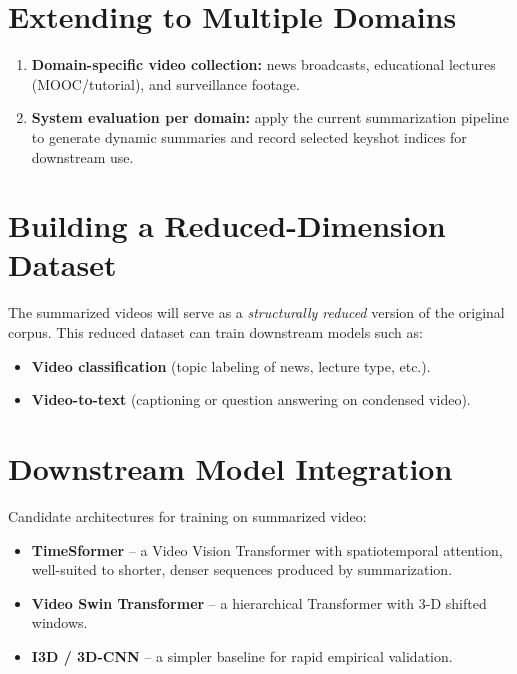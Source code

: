 \documentclass[12pt, a4paper]{report}
\begin{document}
\section{Extending to Multiple Domains}

\begin{enumerate}[leftmargin=1.5cm]
  \item \textbf{Domain-specific video collection:} news broadcasts, educational
        lectures (MOOC/tutorial), and surveillance footage.
  \item \textbf{System evaluation per domain:} apply the current summarization
        pipeline to generate dynamic summaries and record selected keyshot indices
        for downstream use.
\end{enumerate}

\section{Building a Reduced-Dimension Dataset}

The summarized videos will serve as a \emph{structurally reduced} version of the
original corpus. This reduced dataset can train downstream models such as:
\begin{itemize}[leftmargin=1.5cm]
  \item \textbf{Video classification} (topic labeling of news, lecture type, etc.).
  \item \textbf{Video-to-text} (captioning or question answering on condensed video).
\end{itemize}

\section{Downstream Model Integration}

Candidate architectures for training on summarized video:
\begin{itemize}[leftmargin=1.5cm]
  \item \textbf{TimeSformer} -- a Video Vision Transformer with spatiotemporal
        attention, well-suited to shorter, denser sequences produced by summarization.
  \item \textbf{Video Swin Transformer} -- a hierarchical Transformer with 3-D
        shifted windows.
  \item \textbf{I3D / 3D-CNN} -- a simpler baseline for rapid empirical validation.
\end{itemize}
\end{document}
